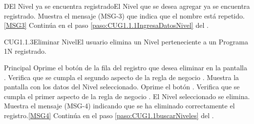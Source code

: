 		\begin{UCtrayectoriaA}{D}{El Nivel ya se encuentra registrado}{El Nivel que se desea agregar ya se encuentra registrado.}
			\UCpaso Muestra el mensaje (MSG-3) que indica que el nombre está repetido.\ref{MSG3}
			\UCpaso Continúa en el paso \ref{paso:CUG1.1.1IngresaDatosNivel} del .
		\end{UCtrayectoriaA}

	\begin{UseCase}{CUG1.1.3}{Eliminar Nivel}{El usuario elimina un Nivel perteneciente a un Programa 1N registrado.}
	\end{UseCase}

	\begin{UCtrayectoria}{Principal}
			\UCpaso[\UCactor] Oprime el botón  de la fila del registro que desea eliminar en la pantalla .
			\UCpaso Verifica que se cumpla el segundo aspecto de la regla de negocio .
			\UCpaso Muestra la pantalla  con los datos del Nivel seleccionado. 
			\UCpaso [\UCactor] Oprime el botón . 
			\UCpaso Verifica que se cumpla el primer aspecto de la regla de negocio . 
			\UCpaso El Nivel seleccionado se elimina.
			\UCpaso Muestra el mensaje (MSG-4) indicando que se ha eliminado correctamente el registro.\ref{MSG4}
			\UCpaso Continúa en el paso \ref{paso:CUG1.1buscarNiveles} del .
	\end{UCtrayectoria}

